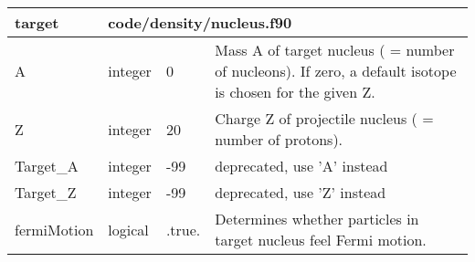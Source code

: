 \documentclass{article}
\begin{document}

\begin{longtable}{llll}
\toprule
\textbf{\large{target}} & \multicolumn{3}{l}{\footnotesize{code/density/nucleus.f90}}\\*
\midrule
\endfirsthead
\midrule
\endhead
A & \begin{minipage}[t]{2cm}integer\end{minipage} & \begin{minipage}[t]{2cm}0\end{minipage} & \begin{minipage}[t]{12cm}Mass A of target nucleus ( = number of nucleons). If zero, a default isotope is chosen for the given Z.\end{minipage}\\*
\midrule
Z & \begin{minipage}[t]{2cm}integer\end{minipage} & \begin{minipage}[t]{2cm}20\end{minipage} & \begin{minipage}[t]{12cm}Charge Z of projectile nucleus ( = number of protons).\end{minipage}\\*
\midrule
Target\_A & \begin{minipage}[t]{2cm}integer\end{minipage} & \begin{minipage}[t]{2cm}-99\end{minipage} & \begin{minipage}[t]{12cm}deprecated, use 'A' instead\end{minipage}\\*
\midrule
Target\_Z & \begin{minipage}[t]{2cm}integer\end{minipage} & \begin{minipage}[t]{2cm}-99\end{minipage} & \begin{minipage}[t]{12cm}deprecated, use 'Z' instead\end{minipage}\\*
\midrule
fermiMotion & \begin{minipage}[t]{2cm}logical\end{minipage} & \begin{minipage}[t]{2cm}.true.\end{minipage} & \begin{minipage}[t]{12cm}Determines whether particles in target nucleus feel Fermi motion.\end{minipage}\\*

\end{longtable}
\end{document}
